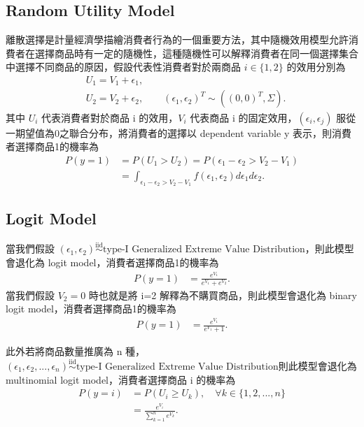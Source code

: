 \documentclass[12pt]{article}
\theoremstyle{definition}
\begin{document}
\begin{sloppypar}
\subsection{Random Utility Model}
離散選擇是計量經濟學描繪消費者行為的一個重要方法，其中隨機效用模型允許消費者在選擇商品時有一定的隨機性，這種隨機性可以解釋消費者在同一個選擇集合中選擇不同商品的原因，假設代表性消費者對於兩商品 $i \in \{1, 2\}$ 的效用分別為
\begin{align*}
    &U_{1} = V_{1} + \epsilon_{1},\\
    &U_{2} = V_{2} + \epsilon_{2}, \qquad (\epsilon_{1}, \epsilon_{2})^T \sim ((0,0)^T, \Sigma).
\end{align*}
其中 $U_{i}$ 代表消費者對於商品 i 的效用，$V_{i}$ 代表商品 i 的固定效用，$(\epsilon_{i}, \epsilon_{j})$ 服從一期望值為0之聯合分布，將消費者的選擇以 dependent variable y 表示，則消費者選擇商品1的機率為
\begin{align*}
    P(y=1) &= P(U_{1} > U_{2}) = P(\epsilon_{1} - \epsilon_{2} > V_{2} - V_{1}) \\ 
    &= \int_{\epsilon_{1} - \epsilon_{2} > V_{2} - V_{1}} f(\epsilon_{1}, \epsilon_{2}) d\epsilon_{1} d\epsilon_{2}.
\end{align*}

\subsection{Logit Model}
當我們假設 $(\epsilon_{1}, \epsilon_{2}) \overset{\mathrm{iid}}{\sim} \text{type-I Generalized Extreme Value Distribution}$，則此模型會退化為 logit model，消費者選擇商品1的機率為
\begin{align*}
    P(y=1) &= \frac{e^{V_{1}}}{e^{V_{1}} + e^{V_{2}}}.
\end{align*}
當我們假設 $V_2=0$ 時也就是將 i=2 解釋為不購買商品，則此模型會退化為 binary logit model，消費者選擇商品1的機率為
\begin{align*}
    P(y=1) &= \frac{e^{V_{1}}}{e^{V_{1}} + 1}.
\end{align*}

此外若將商品數量推廣為 n 種，$(\epsilon_{1}, \epsilon_{2}, ..., \epsilon_{n}) \overset{\mathrm{iid}}{\sim} \text{type-I Generalized Extreme Value Distribution}$則此模型會退化為 multinomial logit model，消費者選擇商品 i 的機率為
\begin{align*}
    P(y = i) &= P(U_i \geq U_k), \quad \forall k \in \{1, 2, ...,n\}\\
    &= \frac{e^{V_{i}}}{\sum_{k=1}^{n} e^{V_{k}}}.
\end{align*}


\end{sloppypar}
\end{document}
